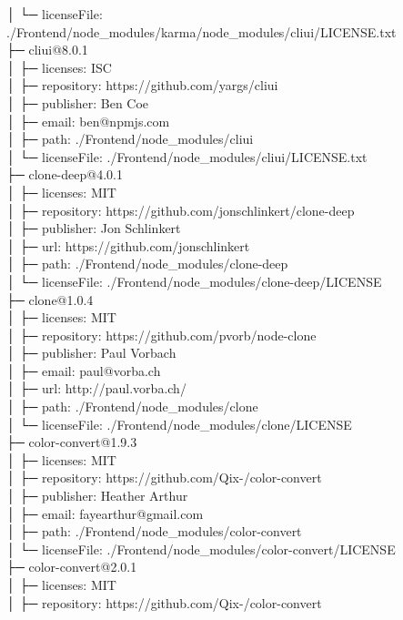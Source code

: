 │  └─ licenseFile: ./Frontend/node\_modules/karma/node\_modules/cliui/LICENSE.txt\\
├─ cliui@8.0.1\\
│  ├─ licenses: ISC\\
│  ├─ repository: https://github.com/yargs/cliui\\
│  ├─ publisher: Ben Coe\\
│  ├─ email: ben@npmjs.com\\
│  ├─ path: ./Frontend/node\_modules/cliui\\
│  └─ licenseFile: ./Frontend/node\_modules/cliui/LICENSE.txt\\
├─ clone-deep@4.0.1\\
│  ├─ licenses: MIT\\
│  ├─ repository: https://github.com/jonschlinkert/clone-deep\\
│  ├─ publisher: Jon Schlinkert\\
│  ├─ url: https://github.com/jonschlinkert\\
│  ├─ path: ./Frontend/node\_modules/clone-deep\\
│  └─ licenseFile: ./Frontend/node\_modules/clone-deep/LICENSE\\
├─ clone@1.0.4\\
│  ├─ licenses: MIT\\
│  ├─ repository: https://github.com/pvorb/node-clone\\
│  ├─ publisher: Paul Vorbach\\
│  ├─ email: paul@vorba.ch\\
│  ├─ url: http://paul.vorba.ch/\\
│  ├─ path: ./Frontend/node\_modules/clone\\
│  └─ licenseFile: ./Frontend/node\_modules/clone/LICENSE\\
├─ color-convert@1.9.3\\
│  ├─ licenses: MIT\\
│  ├─ repository: https://github.com/Qix-/color-convert\\
│  ├─ publisher: Heather Arthur\\
│  ├─ email: fayearthur@gmail.com\\
│  ├─ path: ./Frontend/node\_modules/color-convert\\
│  └─ licenseFile: ./Frontend/node\_modules/color-convert/LICENSE\\
├─ color-convert@2.0.1\\
│  ├─ licenses: MIT\\
│  ├─ repository: https://github.com/Qix-/color-convert\\
